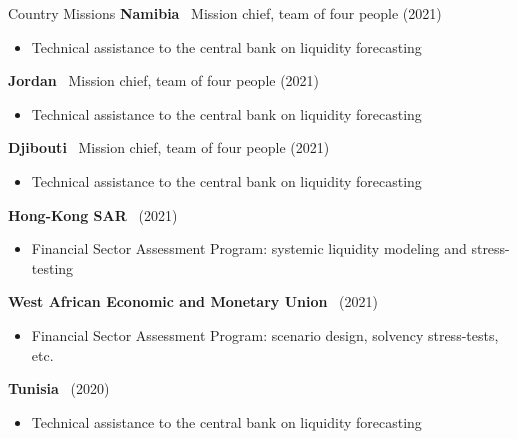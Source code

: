 \documentclass[usegeometry, 10pt, a4paper]{cv} %
\newcommand{\activite}[1]{\textbf{#1}\ }
\newcommand{\midreduce}{-0.5cm}
\begin{document}
\begin{rubriquetableau}[0.95\textwidth]{Country Missions}
  \activite{Namibia} Mission chief, team of four people (2021) \\
  \vspace{\midreduce}
  \begin{itemize}[label={}]
    \item \small{Technical assistance to the central bank on liquidity forecasting}
  \end{itemize}

  \activite{Jordan} Mission chief, team of four people (2021)\\
  \vspace{\midreduce}
  \begin{itemize}[label={}]
    \item \small{Technical assistance to the central bank on liquidity forecasting}
  \end{itemize}
  
  \activite{Djibouti} Mission chief, team of four people (2021)\\
  \vspace{\midreduce}
  \begin{itemize}[label={}]
    \item \small{Technical assistance to the central bank on liquidity forecasting}
  \end{itemize}

  \activite{Hong-Kong SAR} (2021)\\
  \vspace{\midreduce}
  \begin{itemize}[label={}]
    \item \small{Financial Sector Assessment Program: systemic liquidity modeling and stress-testing}
  \end{itemize}

  \activite{West African Economic and Monetary Union} (2021)\\
  \vspace{\midreduce}
  \begin{itemize}[label={}]
    \item \small{Financial Sector Assessment Program: scenario design, solvency stress-tests, etc.}
  \end{itemize}

  \activite{Tunisia} (2020)\\
  \vspace{\midreduce}
  \begin{itemize}[label={}]
    \item \small{Technical assistance to the central bank on liquidity forecasting}
  \end{itemize}


\end{rubriquetableau}
\end{document}
